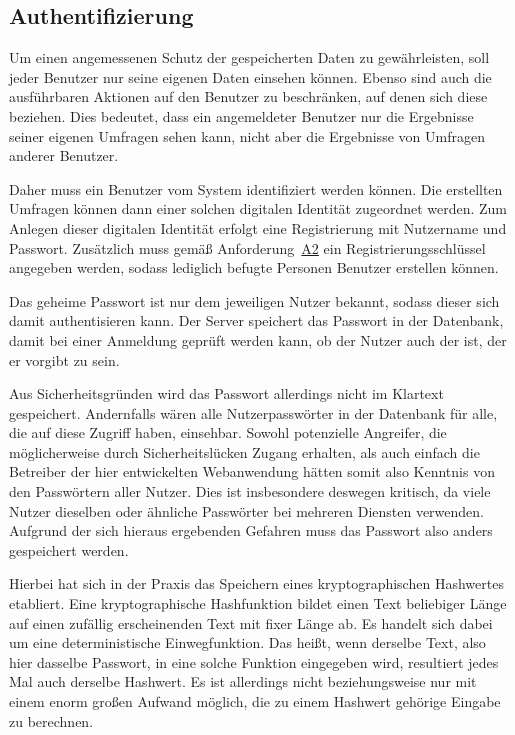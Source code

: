 \subsection{Authentifizierung}
\label{sec:authentifizierung}

Um einen angemessenen Schutz der gespeicherten Daten zu gewährleisten, soll jeder Benutzer nur seine eigenen Daten einsehen können.
Ebenso sind auch die ausführbaren Aktionen auf den Benutzer zu beschränken, auf denen sich diese beziehen.
Dies bedeutet, dass ein angemeldeter Benutzer nur die Ergebnisse seiner eigenen Umfragen sehen kann, nicht aber die Ergebnisse von Umfragen anderer Benutzer.

Daher muss ein Benutzer vom System identifiziert werden können.
Die erstellten Umfragen können dann einer solchen digitalen Identität zugeordnet werden.
Zum Anlegen dieser digitalen Identität erfolgt eine Registrierung mit Nutzername und Passwort.
Zusätzlich muss gemäß Anforderung~\hyperref[Anf:A2]{A2} ein Registrierungsschlüssel angegeben werden, sodass lediglich befugte Personen Benutzer erstellen können.

Das geheime Passwort ist nur dem jeweiligen Nutzer bekannt, sodass dieser sich damit authentisieren kann.
Der Server speichert das Passwort in der Datenbank, damit bei einer Anmeldung geprüft werden kann, ob der Nutzer auch der ist, der er vorgibt zu sein.

Aus Sicherheitsgründen wird das Passwort allerdings nicht im Klartext gespeichert.
Andernfalls wären alle Nutzerpasswörter in der Datenbank für alle, die auf diese Zugriff haben, einsehbar.
Sowohl potenzielle Angreifer, die möglicherweise durch Sicherheitslücken Zugang erhalten, als auch einfach die Betreiber der hier entwickelten Webanwendung hätten somit also Kenntnis von den Passwörtern aller Nutzer.
Dies ist insbesondere deswegen kritisch, da viele Nutzer dieselben oder ähnliche Passwörter bei mehreren Diensten verwenden.
Aufgrund der sich hieraus ergebenden Gefahren muss das Passwort also anders gespeichert werden.

Hierbei hat sich in der Praxis das Speichern eines kryptographischen Hashwertes etabliert.
Eine kryptographische Hashfunktion bildet einen Text beliebiger Länge auf einen zufällig erscheinenden Text mit fixer Länge ab.
Es handelt sich dabei um eine deterministische Einwegfunktion.
Das heißt, wenn derselbe Text, also hier dasselbe Passwort, in eine solche Funktion eingegeben wird, resultiert jedes Mal auch derselbe Hashwert.
Es ist allerdings nicht beziehungsweise nur mit einem enorm großen Aufwand möglich, die zu einem Hashwert gehörige Eingabe zu berechnen.

